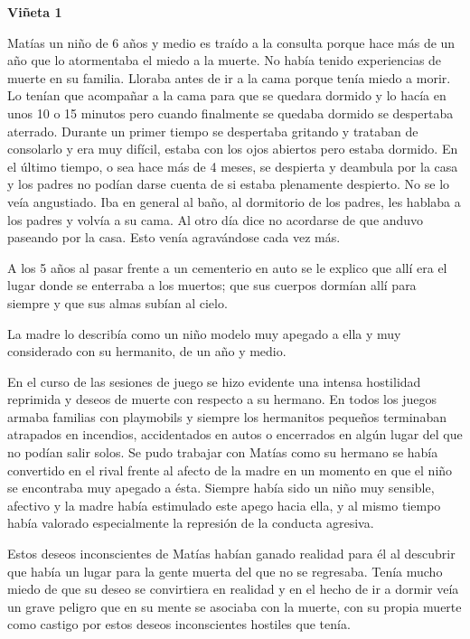 \documentclass[12pt,a4paper]{article}
\begin{document}
\begin{shaded}
\textbf{Viñeta 1}


Matías un niño de 6 años y medio es traído a la consulta porque hace más de
un año que lo atormentaba el miedo a la muerte. No había tenido experiencias
de muerte en su familia. Lloraba antes de ir a la cama porque tenía miedo a
morir. Lo tenían que acompañar a la cama para que se quedara dormido y lo
hacía en unos 10 o 15 minutos pero cuando finalmente se quedaba dormido se
despertaba aterrado. Durante un primer tiempo se despertaba gritando y
trataban de consolarlo y era muy difícil, estaba con los ojos abiertos pero
estaba dormido. En el último tiempo, o sea hace más de 4 meses, se
despierta y deambula por la casa y los padres no podían darse cuenta de si
estaba plenamente despierto. No se lo veía angustiado. Iba en general al baño,
al dormitorio de los padres, les hablaba a los padres y volvía a su cama. Al otro
día dice no acordarse de que anduvo paseando por la casa. Esto venía
agravándose cada vez más.

A los 5 años al pasar frente a un cementerio en auto se le explico que allí era el
lugar donde se enterraba a los muertos; que sus cuerpos dormían allí para
siempre y que sus almas subían al cielo.

La madre lo describía como un niño modelo muy apegado a ella y muy
considerado con su hermanito, de un año y medio.

En el curso de las sesiones de juego se hizo evidente una intensa hostilidad
reprimida y deseos de muerte con respecto a su hermano. En todos los juegos
armaba familias con playmobils y siempre los hermanitos pequeños terminaban
atrapados en incendios, accidentados en autos o encerrados en algún lugar del
que no podían salir solos. Se pudo trabajar con Matías como su hermano se
había convertido en el rival frente al afecto de la madre en un momento en que
el niño se encontraba muy apegado a ésta. Siempre había sido un niño muy
sensible, afectivo y la madre había estimulado este apego hacia ella, y al
mismo tiempo había valorado especialmente la represión de la conducta
agresiva.

Estos deseos inconscientes de Matías habían ganado realidad para él al
descubrir que había un lugar para la gente muerta del que no se regresaba.
Tenía mucho miedo de que su deseo se convirtiera en realidad y en el hecho
de ir a dormir veía un grave peligro que en su mente se asociaba con la
muerte, con su propia muerte como castigo por estos deseos inconscientes
hostiles que tenía.
\end{shaded}
\end{document}

